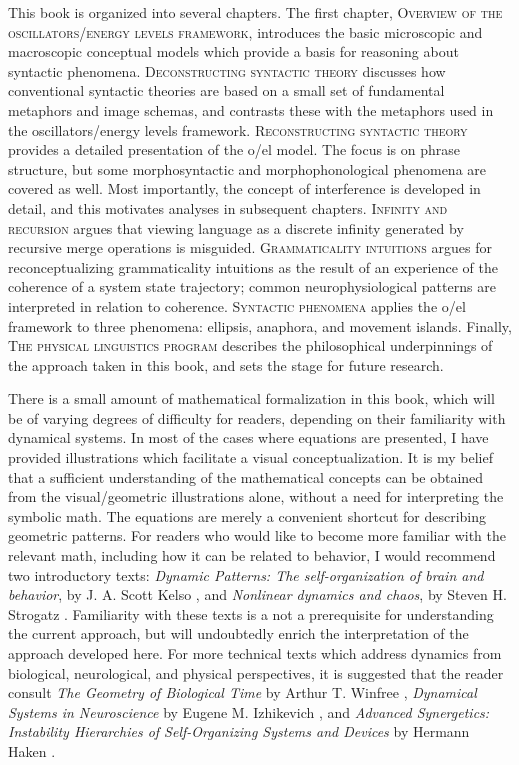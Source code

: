   This book is organized into several chapters. The first chapter, \textsc{Overview of the oscillators/energy levels framework}, introduces the basic microscopic and macroscopic conceptual models which provide a basis for reasoning about syntactic phenomena. \textsc{Deconstructing syntactic theory} discusses how conventional syntactic theories are based on a small set of fundamental metaphors and image schemas, and contrasts these with the metaphors used in the oscillators/energy levels framework. \textsc{Reconstructing syntactic theory} provides a detailed presentation of the o/el model. The focus is on phrase structure, but some morphosyntactic and morphophonological phenomena are covered as well. Most importantly, the concept of interference is developed in detail, and this motivates analyses in subsequent chapters. \textsc{Infinity and recursion} argues that viewing language as a discrete infinity generated by recursive merge operations is misguided. \textsc{Grammaticality intuitions} argues for reconceptualizing grammaticality intuitions as the result of an experience of the coherence of a system state trajectory; common neurophysiological patterns are interpreted in relation to coherence. \textsc{Syntactic phenomena} applies the o/el framework to three phenomena: ellipsis, anaphora, and movement islands. Finally, \textsc{The physical linguistics program} describes the philosophical underpinnings of the approach taken in this book, and sets the stage for future research.

  There is a small amount of mathematical formalization in this book, which will be of varying degrees of difficulty for readers, depending on their familiarity with dynamical systems. In most of the cases where equations are presented, I have provided illustrations which facilitate a visual conceptualization. It is my belief that a sufficient understanding of the mathematical concepts can be obtained from the visual/geometric illustrations alone, without a need for interpreting the symbolic math. The equations are merely a convenient shortcut for describing geometric patterns. For readers who would like to become more familiar with the relevant math, including how it can be related to behavior, I would recommend two introductory texts: \textit{Dynamic Patterns: The self-organization of brain and behavior}, by J. A. Scott Kelso \citep{Kelso1997}, and \textit{Nonlinear dynamics and chaos}, by Steven H. Strogatz \citep{Strogatz2018}. Familiarity with these texts is a not a prerequisite for understanding the current approach, but will undoubtedly enrich the interpretation of the approach developed here. For more technical texts which address dynamics from biological, neurological, and physical perspectives, it is suggested that the reader consult \textit{The Geometry of Biological Time} by Arthur T. Winfree \citep{Winfree2001}, \textit{Dynamical Systems in Neuroscience} by Eugene M. Izhikevich \citep{Izhikevich2007}, and \textit{Advanced Synergetics: Instability Hierarchies of Self-Organizing Systems and Devices} by Hermann Haken \citep{Haken1983a}.

